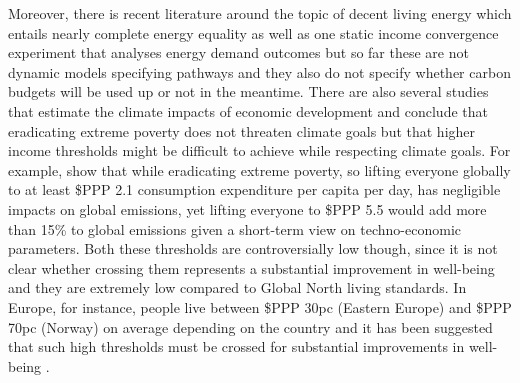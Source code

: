 \documentclass{article}
\begin{document}
Moreover, there is recent literature around the topic of decent living energy which entails nearly complete energy equality \parencite{millward2020providing, kikstra2021decent} as well as one static income convergence experiment that analyses energy demand outcomes \parencite{oswald2021global} but so far these are not dynamic models specifying pathways and they also do not specify whether carbon budgets will be used up or not in the meantime. There are also several studies that estimate the climate impacts of economic development and conclude that eradicating extreme poverty does not threaten climate goals \parencite{hubacek2017poverty, wollburg2023ending} but that higher income thresholds might be difficult to achieve while respecting climate goals. For example, \textcite{bruckner2022impacts} show that while eradicating extreme poverty, so lifting everyone globally to at least \$PPP 2.1 consumption expenditure per capita per day, has negligible impacts on global emissions, yet lifting everyone to \$PPP 5.5 would add more than 15\% to global emissions given a short-term view on techno-economic parameters. Both these thresholds are controversially low though, since it is not clear whether crossing them represents a substantial improvement in well-being \parencite{edward2006ethical} and they are extremely low compared to Global North living standards. In Europe, for instance, people live between \$PPP 30pc (Eastern Europe) and \$PPP 70pc (Norway) on average depending on the country and it has been suggested that such high thresholds must be crossed for substantial improvements in well-being \parencite{owid-poverty-minimum-growth-needed}.  %
\end{document}
